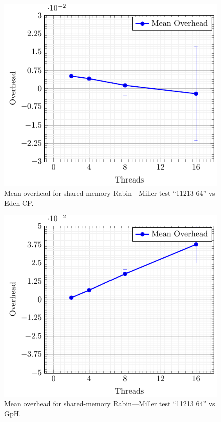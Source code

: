 \documentclass[paper=A4,twoside=true,openright,parskip=full,chapterprefix=true,headings=normal,bibliography=totoc,listof=totoc,titlepage=on,captions=tableabove,draft=false,british]{scrreprt}%
\renewcommand{\enquote}[1]{{``}#1{''}}
\begin{document}
\begin{figure}
\centering
\includegraphics{src/img/overSMRM64Eden.pdf}
\caption{Mean overhead for shared-memory Rabin---Miller test
\enquote{11213 64} vs Eden CP.\label{fig:overSMRM64Eden}}
\end{figure}

\begin{figure}
\centering
\includegraphics{src/img/overSMRM64GpH.pdf}
\caption{Mean overhead for shared-memory Rabin---Miller test
\enquote{11213 64} vs GpH.\label{fig:overSMRM64GpH}}
\end{figure}
\end{document}
